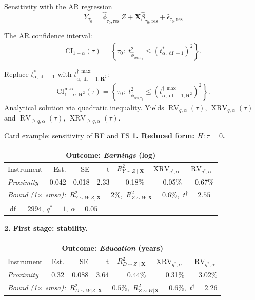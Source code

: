 \documentclass[xcolor=dvipsnames]{beamer}
\newcommand\X{{\bm X}}
\newcommand\R{{\bm R}}
\DeclareMathOperator{\df}{df}
\DeclareMathOperator{\rv}{RV}
\DeclareMathOperator{\xrv}{XRV}
\begin{document}
\begin{frame}{Sensitivity with the AR regression}
\small
\[
Y_{\tau_0} = \hat{\phi}_{\tau_0, \text{res}}\, Z + \X\hat{\beta}_{\tau_0, \text{res}} + \hat{\epsilon}_{\tau_0, \text{res}}
\]

The AR confidence interval:
\begin{align*}
\text{CI}_{1-\alpha}(\tau) = \left\{\tau_0 :\; t^2_{\hat{\phi}_{\text{res}, \tau_0}} \leq (t^*_{\alpha, \df-1})^2\right\}.
\end{align*}

Replace $t^*_{\alpha, \df-1}$ with $t^{\dagger\,\max}_{\alpha, \df-1, \R^2}$:
\begin{align*}
\text{CI}^{\max}_{1-\alpha, \R^2}(\tau) = \left\{\tau_0 :\; t^2_{\hat{\phi}_{\text{res}, \tau_0}} \leq (t^{\dagger\,\max}_{\alpha, \df-1, \R^2})^2\right\}.
\end{align*}
\footnotesize
Analytical solution via quadratic inequality. Yields $\rv_{q,\alpha}(\tau)$, $\xrv_{q,\alpha}(\tau)$ and $\rv_{\geq q,\alpha}(\tau)$, $\xrv_{\geq q,\alpha}(\tau)$.
\end{frame}


\begin{frame}{Card example: sensitivity of RF and FS}
 \textbf{1. Reduced form: $H: \tau = 0$.}
\footnotesize
\begin{table}[!ht]
\centering
\begin{tabular}{lrrrrrr}
\multicolumn{7}{c}{Outcome: \textit{Earnings} (log)} \\
\hline\hline
Instrument & Est. & SE & t & $R^2_{Y\sim Z \mid \X}$ & $\xrv_{q^*,\alpha}$ & $\rv_{q^*,\alpha}$ \\
\hline
\textit{Proximity} & 0.042 & 0.018 & 2.33 & 0.18\% & 0.05\% & 0.67\% \\
\hline
\multicolumn{7}{l}{\small \textit{Bound (1$\times$ smsa):}\ $R^2_{Y\sim W|Z,\X} = 2\%$,\ $R^2_{Z\sim W|\X} = 0.6\%$,\ $t^\dagger = 2.55$}\\
\multicolumn{7}{l}{\small $\df = 2994,\ q^* = 1,\ \alpha = 0.05$}
\end{tabular}
\end{table}
\normalsize
\bigskip
{} \textbf{2. First stage: stability.}
\footnotesize
\begin{table}[!b]
\centering
\begin{tabular}{lrrrrrr}
\multicolumn{7}{c}{Outcome: \textit{Education} (years)} \\
\hline\hline
Instrument & Est. & SE & t & $R^2_{D\sim Z \mid \X}$ & $\xrv_{q^*,\alpha}$ & $\rv_{q^*,\alpha}$ \\
\hline
\textit{Proximity} & 0.32 & 0.088 & 3.64 & 0.44\% & 0.31\% & 3.02\% \\
\hline
\multicolumn{7}{l}{\small \textit{Bound (1$\times$ smsa):}\ $R^2_{D\sim W|Z,\X} = 0.5\%$,\ $R^2_{Z\sim W|\X} = 0.6\%$,\ $t^\dagger = 2.26$}
\end{tabular}
\end{table}
\end{frame}
\end{document}
